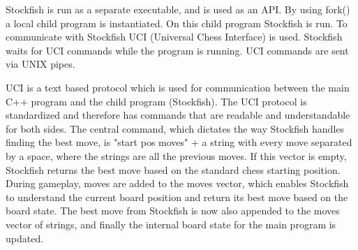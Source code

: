 Stockfish is run as a separate executable, and is used as an API. By using fork() \cite{Fork} a local child program is instantiated. On this child program Stockfish is run. To communicate with Stockfish UCI (Universal Chess Interface) is used. Stockfish waits for UCI commands while the program is running. UCI commands are sent via UNIX pipes. \cite{Pipe}

UCI is a text based protocol which is used for communication between the main C++ program and the child program (Stockfish). The UCI protocol is standardized and therefore has commands that are readable and understandable for both sides.  \cite{StockfishUCI} The central command, which dictates the way Stockfish handles finding the best move, is "start pos moves" + a string with every move separated by a space, where the strings are all the previous moves. If this vector is empty, Stockfish returns the best move based on the standard chess starting position. During gameplay, moves are added to the moves vector, which enables Stockfish to understand the current board position and return its best move based on the board state.
The best move from Stockfish is now also appended to the moves vector of strings, and finally the internal board state for the main program is updated. 